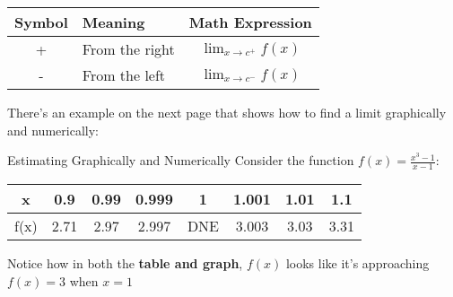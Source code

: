 \documentclass{MathNotes}
\begin{document}
\begin{table}[h]
    \label{tab:1.2}
    \begin{center}
        \begin{tabular}{ |c|l|c| }
            \hline
            Symbol & Meaning & Math Expression\\
            \hline
            \hline
            + & From the right & $\lim_{x\to c^+}f(x)$ \\
            \hline
            - & From the left & $\lim_{x\to c^-}f(x)$ \\
            \hline
        \end{tabular}
    \end{center}
\end{table}


There's an example on the next page that shows how to find a limit graphically
and numerically:

\begin{example}{Estimating Graphically and Numerically}\label{ex:1.2}
    Consider the function $f(x)=\frac{x^3-1}{x-1}$:
    \begin{center}

        \begin{tabular}{ |c||c|c|c|c|c|c|c| }
            \hline
            x    & 0.9 & 0.99 & 0.999 & 1 & 1.001 & 1.01 & 1.1\\
            \hline
            f(x) & 2.71 & 2.97 & 2.997 &DNE& 3.003 & 3.03 & 3.31 \\
            \hline
        \end{tabular}
    \end{center}

    Notice how in both the \textbf{table and graph}, $f(x)$ looks like it's
    approaching $f(x)=3$ when $x=1$
\end{example}
\end{document}
